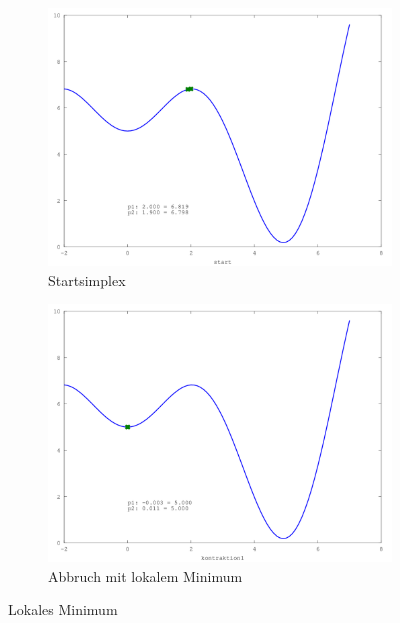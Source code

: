 \begin{figure}[htb]
\centering
\begin{subfigure}[b]{0.49\textwidth}
\centering
\includegraphics[width=\textwidth]{downhill/lok_sinx_x001.png}
\caption{Startsimplex}
\end{subfigure} \begin{subfigure}[b]{0.49\textwidth}
\centering
\includegraphics[width=\textwidth]{downhill/lok_sinx_x010.png}
\caption{Abbruch mit lokalem Minimum}
\end{subfigure}

\caption{Lokales Minimum}
\label{fig:downhillLokMinima}
\end{figure}

